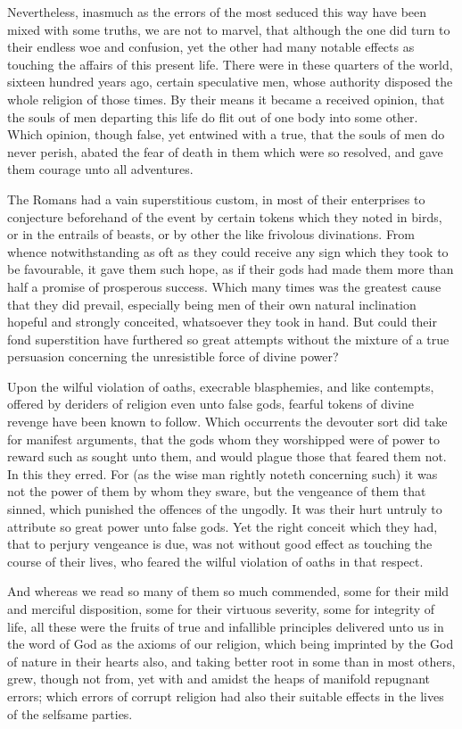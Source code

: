 Nevertheless, inasmuch as the errors of the most seduced this way have been mixed with some truths, we are not to marvel, that although the one did turn to their endless woe and confusion, yet the other had many notable effects as touching the affairs of this present life. There were in these quarters of the world, sixteen hundred years ago, certain speculative men, whose authority disposed the whole religion of those times. By their means it became a received opinion, that the souls of men departing this life do flit out of one body into some other. Which opinion, though false, yet entwined with a true, that the souls of men do never perish, abated the fear of death in them which were so resolved, and gave them courage unto all adventures.

The Romans had a vain superstitious custom, in most of their enterprises to conjecture beforehand of the event by certain tokens which they noted in birds, or in the entrails of beasts, or by other the like frivolous divinations. From whence notwithstanding as oft as they could receive any sign which they took to be favourable, it gave them such hope, as if their gods had made them more than half a promise of prosperous success. Which many times was the greatest cause that they did prevail, especially being men of their own natural inclination hopeful and strongly conceited, whatsoever they took in hand. But could their fond superstition have furthered so great attempts without the mixture of a true persuasion concerning the unresistible force of divine power?

Upon the wilful violation of oaths, execrable blasphemies, and like contempts, offered by deriders of religion even unto false gods, fearful tokens of divine revenge have been known to follow. Which occurrents the devouter sort did take for manifest arguments, that the gods whom they worshipped were of power to reward such as sought unto them, and would plague those that feared them not. In this they erred. For (as the wise man rightly noteth concerning such) it was not the power of them by whom they sware, but the vengeance of them that sinned, which punished the offences of the ungodly. It was their hurt untruly to attribute so great power  unto false gods.
 Yet the right conceit which they had, that to perjury vengeance is due, was not without good effect as touching the course of their lives, who feared the wilful violation of oaths in that respect.

And whereas we read so many of them so much commended, some for their mild and merciful disposition, some for their virtuous severity, some for integrity of life, all these were the fruits of true and infallible principles delivered unto us in the word of God as the axioms of our religion, which being imprinted by the God of nature in their hearts also, and taking better root in some than in most others, grew, though not from, yet with and amidst the heaps of manifold repugnant errors; which errors of corrupt religion had also their suitable effects in the lives of the selfsame parties.

